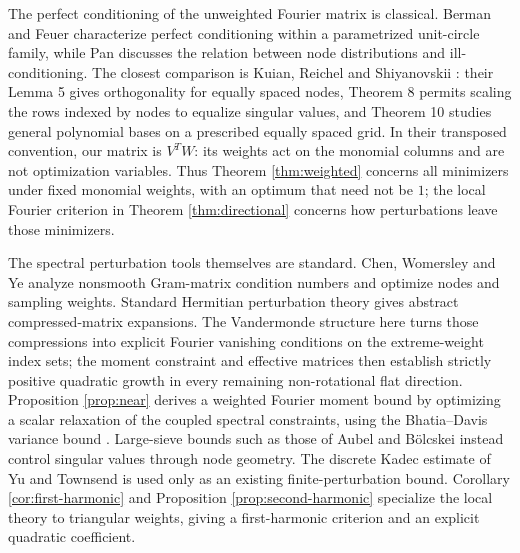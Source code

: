 \documentclass[10pt,twoside,final]{siamart1116}
\numberwithin{equation}{section}
\numberwithin{theorem}{section}
\begin{document}
The perfect conditioning of the unweighted Fourier matrix is classical.
Berman and Feuer \cite[Lemma 3.1]{berman} characterize perfect conditioning within a
parametrized unit-circle family, while Pan \cite{pan} discusses the relation between
node distributions and ill-conditioning. The closest comparison is Kuian, Reichel
and Shiyanovskii \cite{kuian}: their Lemma 5 gives orthogonality for equally spaced
nodes, Theorem 8 permits scaling the rows indexed by nodes to equalize singular
values, and Theorem 10 studies general polynomial bases on a prescribed equally
spaced grid. In their transposed convention, our matrix is $V^TW$: its weights act on
the monomial columns and are not optimization variables. Thus Theorem
\ref{thm:weighted} concerns all minimizers under fixed monomial weights, with an
optimum that need not be $1$; the local Fourier criterion in Theorem
\ref{thm:directional} concerns how perturbations leave those minimizers.

The spectral perturbation tools themselves are standard. Chen, Womersley and Ye
\cite[Sections 2 and 4]{chen} analyze nonsmooth Gram-matrix condition numbers and
optimize nodes and sampling weights. Standard Hermitian perturbation theory gives
abstract compressed-matrix expansions. The Vandermonde structure here turns those
compressions into explicit Fourier vanishing conditions on the extreme-weight
index sets; the moment constraint and effective matrices then establish strictly
positive quadratic growth in every remaining non-rotational flat direction.
Proposition \ref{prop:near} derives a weighted Fourier moment bound by optimizing
a scalar relaxation of the coupled spectral constraints, using the Bhatia--Davis
variance bound \cite{bhatia}. Large-sieve bounds such as those of Aubel
and B\"olcskei \cite{aubel} instead control singular values through node geometry.
The discrete Kadec estimate of Yu and Townsend \cite{yu} is used only as an
existing finite-perturbation bound. Corollary \ref{cor:first-harmonic} and
Proposition \ref{prop:second-harmonic} specialize the local theory to triangular
weights, giving a first-harmonic criterion and an explicit quadratic coefficient.
\end{document}
